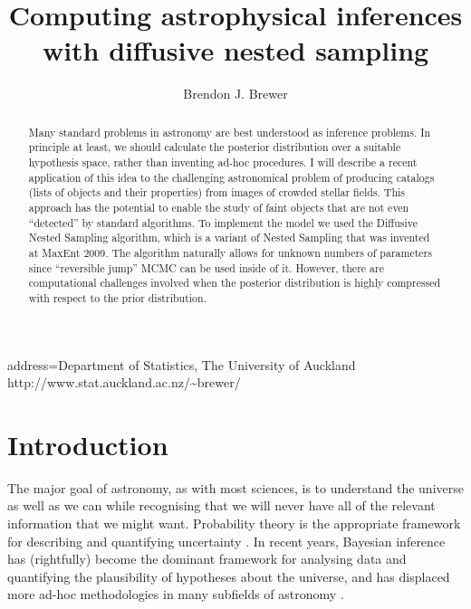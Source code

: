 \documentclass[
  ,final            %
  ]
  {aipproc}
\begin{document}
\title{Computing astrophysical inferences with diffusive nested sampling}


\author{Brendon J. Brewer}{
  address={Department of Statistics, The University of Auckland\\
http://www.stat.auckland.ac.nz/\~{ }brewer/}
}


\begin{abstract}
Many standard problems in astronomy are best understood as inference problems.
In principle at least,
we should calculate the posterior distribution over a suitable hypothesis space,
rather than inventing ad-hoc procedures. I will describe a recent application
of this idea to the challenging astronomical problem of
producing catalogs (lists of objects
and their properties) from images of
crowded stellar fields. This approach
has the potential to enable the study of faint objects that are not
even ``detected'' by standard algorithms.
To implement the model we used the Diffusive Nested Sampling algorithm,
which is a variant of Nested Sampling that was invented at MaxEnt 2009. The
algorithm naturally allows for unknown numbers of parameters since
``reversible jump'' MCMC can be used inside of it. However, there are
computational challenges involved when the posterior distribution is highly
compressed with respect to the prior distribution.
\end{abstract}

\maketitle


\section{Introduction}
The major goal of astronomy, as with most sciences, is to understand the
universe as well as we can while recognising that we will never have all of
the relevant information that we might want. Probability theory is the
appropriate framework for describing and quantifying uncertainty
\citep{cox, jaynes}. In recent years, Bayesian inference has (rightfully)
become the dominant framework for analysing data and quantifying the
plausibility of hypotheses about the universe, and has displaced
more ad-hoc methodologies in many subfields of
astronomy \citep[e.g.][]{2014MNRAS.438..768S, 2014MNRAS.437.3540F,
2014MNRAS.437.3004L}.
\end{document}
